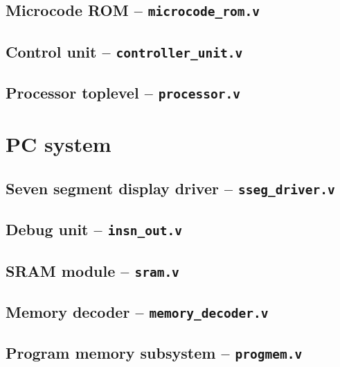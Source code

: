 \subsection{Microcode ROM -- \texttt{microcode\_rom.v}}

\subsection{Control unit -- \texttt{controller\_unit.v}}

\subsection{Processor toplevel -- \texttt{processor.v}}

\section{PC system}\label{sec:pc_system}
\subsection{Seven segment display driver -- \texttt{sseg\_driver.v}}

\subsection{Debug unit -- \texttt{insn\_out.v}}

\subsection{SRAM module -- \texttt{sram.v}}

\subsection{Memory decoder -- \texttt{memory\_decoder.v}}

\subsection{Program memory subsystem -- \texttt{progmem.v}}

